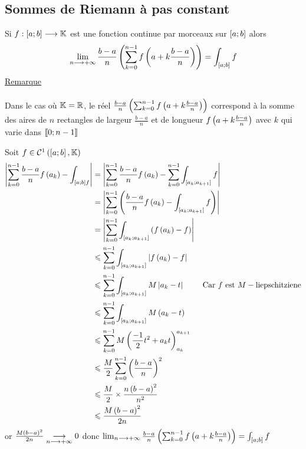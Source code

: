 \subsection{Sommes de Riemann à pas constant}
\begin{defprop}
    Si \(f : \left[a;b\right] \longrightarrow \mathbb{K}\) est une fonction continue par morceaux sur \(\left[a;b\right]\) alors
    \[\lim_{n\longrightarrow+\infty} \frac{b -  a}{n} \left(\sum^{n- 1}_{k=0} f \left(a + k \frac{b -  a}{n}\right)\right) = \int_{\left[a;b\right]} f \]
    \underline{Remarque} \\~\\
    Dans le cas où \(\mathbb{K} = \mathbb{R}\), le réel \(\frac{b -  a}{n} \left(\sum^{n- 1}_{k=0} f \left(a + k \frac{b -  a}{n}\right)\right)\) correspond à la somme des aires de \(n\) rectangles de largeur \(\frac{b - a}{n}\) et de longueur \(f\left(a + k \frac{b -  a}{n}\right)\) avec \(k\) qui varie dans \(\left\llbracket0;n -  1\right\rrbracket\)
\end{defprop}
\begin{dem}
    Soit \(f \in \mathcal{C}^1\left(\left[a;b\right],\mathbb{K}\right)\)
    \begin{align*}
         \left\lvert\sum^{n-1}_{k=0}\frac{b -  a}{n} f \left(a_k\right) - \int_{\left[a;b\right] f}\right\rvert &= \left\lvert\sum^{n-1}_{k=0}\frac{b -  a}{n} f \left(a_k\right) - \sum^{n-1}_{k=0}\int_{\left[a_k;a_{k+1}\right]}f\right\rvert\\
        & = \left\lvert\sum^{n-1}_{k=0} \left(\frac{b -  a}{n} f \left(a_k\right) - \int_{\left[a_k;a_{k+1}\right]}f\right)\right\rvert\\
        & = \left\lvert\sum^{n-1}_{k=0}\int_{\left[a_k;a_{k+1}\right]} \left( f \left(a_k\right) - f\right)\right\rvert\\
        & \leqslant \sum^{n-1}_{k=0}\int_{\left[a_k;a_{k+1}\right]} \left\lvert f \left(a_k\right) - f\right\rvert \\
        &\leqslant \sum^{n-1}_{k=0}\int_{\left[a_k;a_{k+1}\right]} M\left\lvert a_k - t\right\rvert \qquad  \text{ Car } f \text{ est } M-\text{liepschitziene} \\
        &\leqslant \sum^{n-1}_{k=0} \int_{\left[a_k;a_{k+1}\right]} M\left(a_k - t\right) \\
        & \leqslant    \sum^{n-1}_{k=0} M \left(\frac{-1}{2}t^2 + a_kt\right)^{a_{k+1}}_{a_k} \\
        &\leqslant \frac{M}{2} \sum^{n-1}_{k=0} \left(\frac{b-a}{n}\right)^2 \\
        & \leqslant\frac{M}{2} \times \frac{n \left(b-a\right)^2}{n^2}\\
        &\leqslant \frac{ M\left(b-a\right)^2}{2n}
        \end{align*}
    or \(\frac{ M\left(b-a\right)^2}{2n} \underset{n \longrightarrow +\infty}{\longrightarrow} 0\) donc \(\lim_{n\longrightarrow+\infty} \frac{b -  a}{n} \left(\sum^{n- 1}_{k=0} f \left(a + k \frac{b -  a}{n}\right)\right) = \int_{\left[a;b\right]} f\)
\end{dem}
